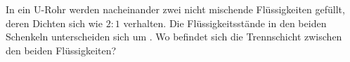 In ein U-Rohr werden nacheinander zwei nicht mischende Flüssigkeiten gefüllt, deren Dichten sich wie $2:1$ verhalten. Die Flüssigkeitsstände in den beiden Schenkeln unterscheiden sich um \dhsO. Wo befindet sich die Trennschicht zwischen den beiden Flüssigkeiten?
